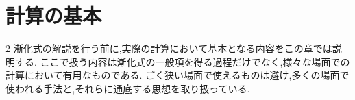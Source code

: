 
\chapter{計算の基本}
\begin{multicols*}{2}
  漸化式の解説を行う前に,実際の計算において基本となる内容をこの章では説明する.
  ここで扱う内容は漸化式の一般項を得る過程だけでなく,様々な場面での計算において有用なものである.
  ごく狭い場面で使えるものは避け,多くの場面で使われる手法と,それらに通底する思想を取り扱っている.









\end{multicols*}
